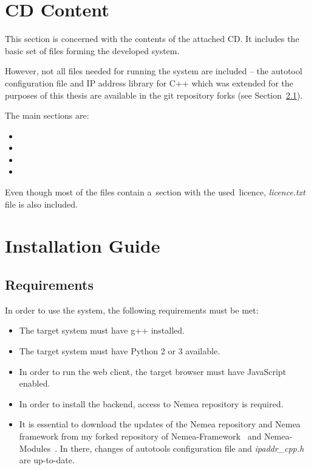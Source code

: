 \setlength{\parindent}{0em}
\setlength{\parskip}{1em}

\csdoublequotesoff
\chapter{CD Content}
This section is concerned with the contents of the attached CD.
It includes the basic set of files forming the developed system.

However, not all files needed for running the system are included -- the
autotool configuration file and IP address library for C++ which was
extended for the purposes of this thesis are available in the git
repository forks (see Section~\ref{sec:requirements}).

The main sections are:
\begin{itemize}
  \item {} 
  \item {} 
  \item {} 
  \item {} 
\end{itemize}

Even though most of the files contain a~section with the used~licence, \textit{licence.txt} file is also included.


\chapter{Installation Guide}
\section{Requirements}\label{sec:requirements}
In order to use the system, the following requirements must be met:
\begin{itemize}
   \item The target system must have g++ installed.
   \item The target system must have Python 2 or 3 available.
   \item In order to run the web client, the target browser must have JavaScript enabled.
   \item In order to install the backend, access to Nemea repository is required.
   \item It is essential to download the updates of the Nemea repository and Nemea framework
   from my forked repository of Nemea-Framework~\cite{my_repo_framework} and Nemea-Modules~\cite{my_repo_modules}.
   In there, changes of autotools configuration file and \textit{ipaddr\_cpp.h} are up-to-date.
\end{itemize}

